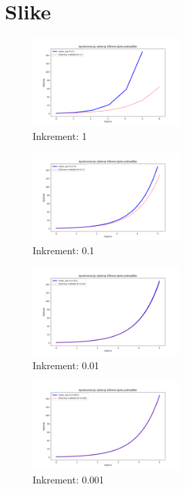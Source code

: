 \documentclass[conference]{IEEEtran}
\begin{document}
\section{Slike}
    \begin{figure}[htbp]
        \includegraphics[width=0.5\textwidth]{slike/Figure_1.png}
        \caption{Inkrement: 1}
        \label{fig:Figure_1}
     \end{figure}
     \begin{figure}[htbp]
        \includegraphics[width=0.5\textwidth]{slike/Figure_2.png}
        \caption{Inkrement: 0.1}
        \label{fig:Figure_2}
    \end{figure}
     \begin{figure}[htbp]
        \includegraphics[width=0.5\textwidth]{slike/Figure_3.png}
        \caption{Inkrement: 0.01}
        \label{fig:Figure_3}
    \end{figure}
     \begin{figure}[htbp]
        \includegraphics[width=0.5\textwidth]{slike/Figure_4.png}
        \caption{Inkrement: 0.001}
        \label{fig:Figure_4}
    \end{figure}
\end{document}
